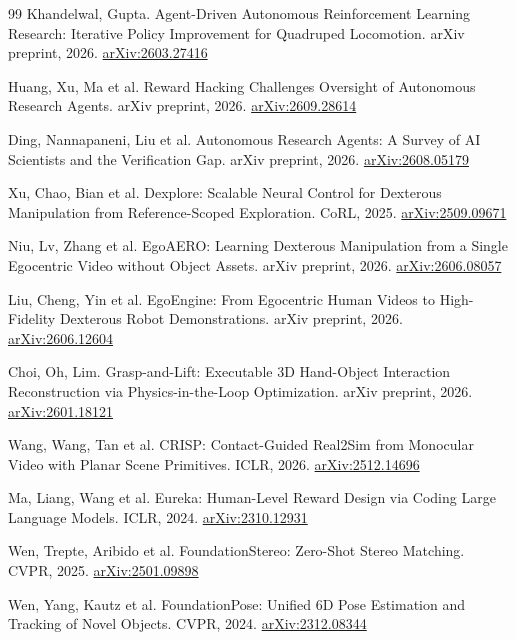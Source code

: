\documentclass[11pt]{article}
\begin{document}
\begin{thebibliography}{99}
 Khandelwal, Gupta. Agent-Driven Autonomous Reinforcement Learning Research: Iterative Policy Improvement for Quadruped Locomotion. arXiv preprint, 2026. \href{https://arxiv.org/abs/2603.27416}{arXiv:2603.27416}

 Huang, Xu, Ma et al. Reward Hacking Challenges Oversight of Autonomous Research Agents. arXiv preprint, 2026. \href{https://arxiv.org/abs/2609.28614}{arXiv:2609.28614}

 Ding, Nannapaneni, Liu et al. Autonomous Research Agents: A Survey of AI Scientists and the Verification Gap. arXiv preprint, 2026. \href{https://arxiv.org/abs/2608.05179}{arXiv:2608.05179}

 Xu, Chao, Bian et al. Dexplore: Scalable Neural Control for Dexterous Manipulation from Reference-Scoped Exploration. CoRL, 2025. \href{https://arxiv.org/abs/2509.09671}{arXiv:2509.09671}

 Niu, Lv, Zhang et al. EgoAERO: Learning Dexterous Manipulation from a Single Egocentric Video without Object Assets. arXiv preprint, 2026. \href{https://arxiv.org/abs/2606.08057}{arXiv:2606.08057}

 Liu, Cheng, Yin et al. EgoEngine: From Egocentric Human Videos to High-Fidelity Dexterous Robot Demonstrations. arXiv preprint, 2026. \href{https://arxiv.org/abs/2606.12604}{arXiv:2606.12604}

 Choi, Oh, Lim. Grasp-and-Lift: Executable 3D Hand-Object Interaction Reconstruction via Physics-in-the-Loop Optimization. arXiv preprint, 2026. \href{https://arxiv.org/abs/2601.18121}{arXiv:2601.18121}

 Wang, Wang, Tan et al. CRISP: Contact-Guided Real2Sim from Monocular Video with Planar Scene Primitives. ICLR, 2026. \href{https://arxiv.org/abs/2512.14696}{arXiv:2512.14696}

 Ma, Liang, Wang et al. Eureka: Human-Level Reward Design via Coding Large Language Models. ICLR, 2024. \href{https://arxiv.org/abs/2310.12931}{arXiv:2310.12931}

 Wen, Trepte, Aribido et al. FoundationStereo: Zero-Shot Stereo Matching. CVPR, 2025. \href{https://arxiv.org/abs/2501.09898}{arXiv:2501.09898}

 Wen, Yang, Kautz et al. FoundationPose: Unified 6D Pose Estimation and Tracking of Novel Objects. CVPR, 2024. \href{https://arxiv.org/abs/2312.08344}{arXiv:2312.08344}


\end{thebibliography}
\end{document}
